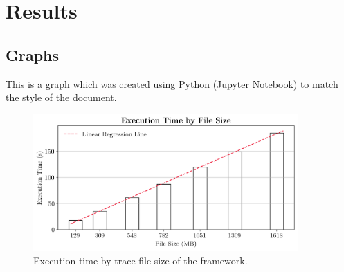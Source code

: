 \chapter{Results}
\label{chap:results}

\section{Graphs}

This is a graph which was created using Python (Jupyter Notebook) to match the style of the document.

\begin{figure}[htbp]
    \centering
    \includegraphics[width=0.9\textwidth]{figures/execution-time.png}
    \caption{Execution time by trace file size of the framework.}
    \label{fig:execution-time}
\end{figure}
